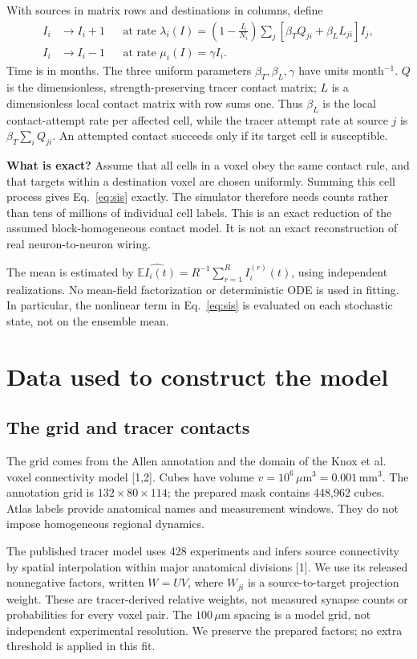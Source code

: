 \documentclass[10pt]{article}
\newcommand{\um}{\,\mu\mathrm{m}}\newcommand{\E}{\mathbb{E}}
\begin{document}
With sources in matrix rows and destinations in columns, define
\begin{align}
 I_i&\longrightarrow I_i+1
 &&\text{at rate }\lambda_i(I)=\left(1-\frac{I_i}{N_i}\right)
       \sum_j\left[\beta_T Q_{ji}+\beta_L L_{ji}\right]I_j,\label{eq:sis}\\
 I_i&\longrightarrow I_i-1
 &&\text{at rate }\mu_i(I)=\gamma I_i.\nonumber
\end{align}
Time is in months. The three uniform parameters $\beta_T,\beta_L,\gamma$ have units month$^{-1}$. $Q$ is the dimensionless, strength-preserving tracer contact matrix; $L$ is a dimensionless local contact matrix with row sums one. Thus $\beta_L$ is the local contact-attempt rate per affected cell, while the tracer attempt rate at source $j$ is $\beta_T\sum_i Q_{ji}$. An attempted contact succeeds only if its target cell is susceptible.

\textbf{What is exact?} Assume that all cells in a voxel obey the same contact rule, and that targets within a destination voxel are chosen uniformly. Summing this cell process gives Eq.~\ref{eq:sis} exactly. The simulator therefore needs counts rather than tens of millions of individual cell labels. This is an exact reduction of the assumed block-homogeneous contact model. It is not an exact reconstruction of real neuron-to-neuron wiring.

The mean is estimated by $\widehat{\E I_i(t)}=R^{-1}\sum_{r=1}^{R}I_i^{(r)}(t)$, using independent realizations. No mean-field factorization or deterministic ODE is used in fitting. In particular, the nonlinear term in Eq.~\ref{eq:sis} is evaluated on each stochastic state, not on the ensemble mean.

\newpage
\section{Data used to construct the model}
\subsection{The grid and tracer contacts}
The grid comes from the Allen annotation and the domain of the Knox et al. voxel connectivity model [1,2]. Cubes have volume $v=10^6\um^3=0.001\mathrm{\,mm}^3$. The annotation grid is $132\times80\times114$; the prepared mask contains 448,962 cubes. Atlas labels provide anatomical names and measurement windows. They do not impose homogeneous regional dynamics.

The published tracer model uses 428 experiments and infers source connectivity by spatial interpolation within major anatomical divisions [1]. We use its released nonnegative factors, written $W=UV$, where $W_{ji}$ is a source-to-target projection weight. These are tracer-derived relative weights, not measured synapse counts or probabilities for every voxel pair. The $100\um$ spacing is a model grid, not independent experimental resolution. We preserve the prepared factors; no extra threshold is applied in this fit.
\end{document}
